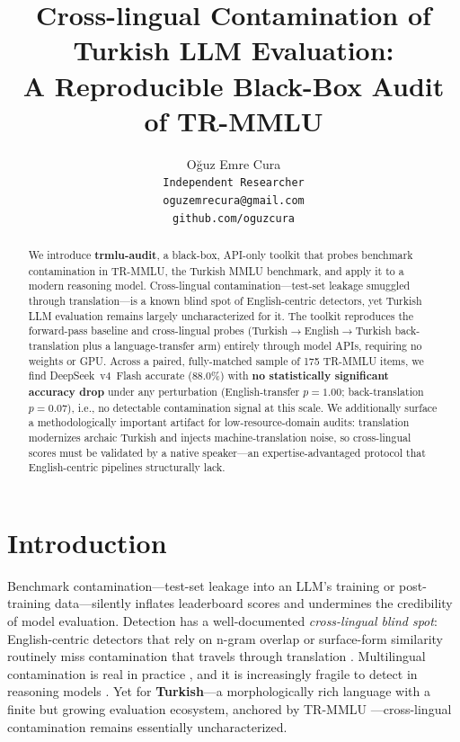 \documentclass[11pt]{article}
\title{Cross-lingual Contamination of Turkish LLM Evaluation:\\ A Reproducible Black-Box Audit of TR-MMLU}
\author{
  O\u{g}uz Emre Cura\\
  \texttt{Independent Researcher}\\
  \texttt{oguzemrecura@gmail.com}\\
  \texttt{github.com/oguzcura}
}
\date{}
\begin{document}
\maketitle

\begin{abstract}
We introduce \textbf{trmlu-audit}, a black-box, API-only toolkit that probes benchmark contamination in TR-MMLU, the Turkish MMLU benchmark, and apply it to a modern reasoning model. Cross-lingual contamination---test-set leakage smuggled through translation---is a known blind spot of English-centric detectors, yet Turkish LLM evaluation remains largely uncharacterized for it. The toolkit reproduces the forward-pass baseline and cross-lingual probes (Turkish$\rightarrow$English$\rightarrow$Turkish back-translation plus a language-transfer arm) entirely through model APIs, requiring no weights or GPU. Across a paired, fully-matched sample of 175 TR-MMLU items, we find DeepSeek~v4~Flash accurate (88.0\%) with \textbf{no statistically significant accuracy drop} under any perturbation (English-transfer $p{=}1.00$; back-translation $p{=}0.07$), i.e., no detectable contamination signal at this scale. We additionally surface a methodologically important artifact for low-resource-domain audits: translation modernizes archaic Turkish and injects machine-translation noise, so cross-lingual scores must be validated by a native speaker---an expertise-advantaged protocol that English-centric pipelines structurally lack.
\end{abstract}

\section{Introduction}

Benchmark contamination---test-set leakage into an LLM's training or post-training data---silently inflates leaderboard scores and undermines the credibility of model evaluation. Detection has a well-documented \emph{cross-lingual blind spot}: English-centric detectors that rely on n-gram overlap or surface-form similarity routinely miss contamination that travels through translation \cite{yang2024data}. Multilingual contamination is real in practice \cite{contammulti2024}, and it is increasingly fragile to detect in reasoning models \cite{fragile2025reasoning}. Yet for \textbf{Turkish}---a morphologically rich language with a finite but growing evaluation ecosystem, anchored by TR-MMLU \cite{trmmu2024}---cross-lingual contamination remains essentially uncharacterized.
\end{document}
